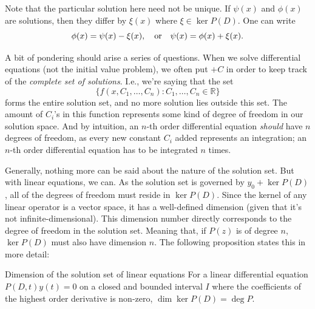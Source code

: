 Note that the particular solution here need not be unique. If \(\psi(x)\) and \(\phi(x)\)
are solutions, then they differ by \(\xi(x)\) where \(\xi \in \ker P(D)\). One can write
\begin{equation}
  \phi(x) = \psi(x) - \xi(x), \quad\textrm{or}\quad \psi(x) = \phi(x) + \xi(x).
\end{equation}

A bit of pondering should arise a series of questions. When we solve differential
equations (not the initial value problem), we often put \(+ C\) in order to keep track
of the \emph{complete set of solutions}. I.e., we're saying that the set
\begin{equation}
  \{f(x, C_1, \dots, C_n) : C_1, \dots, C_n \in \mathbb{R}\}
\end{equation}
forms the entire solution set, and no more solution lies outside this set. The amount
of \(C_i\)'s in this function represents some kind of degree of freedom in our solution
space. And by intuition, an \(n\)-th order differential equation \emph{should} have \(n\)
degrees of freedom, as every new constant \(C_i\) added represents an integration; an
\(n\)-th order differential equation has to be integrated \(n\) times.

Generally, nothing more can be said about the nature of the solution set. But with
linear equations, we can. As the solution set is governed by \(y_0 + \ker P(D)\), all
of the degrees of freedom must reside in \(\ker P(D)\). Since the kernel of any linear
operator is a vector space, it has a well-defined dimension (given that it's not
infinite-dimensional). This dimension number directly corresponds to the degree of freedom
in the solution set. Meaning that, if \(P(z)\) is of degree \(n\), \(\ker P(D)\) must
also have dimension \(n\). The following proposition states this in more detail:

\begin{prop}{Dimension of the solution set of linear equations}{}
  For a linear differential equation \(P(D, t)y(t) = 0\) on a closed and bounded interval \(I\)
  where the coefficients of the highest order derivative is non-zero, \(\dim \ker P(D) = \deg P\).
\end{prop}

